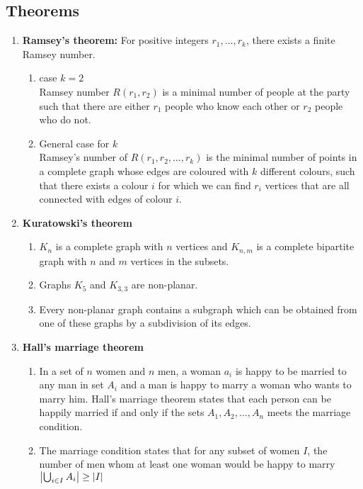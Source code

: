 \documentclass{article}
\begin{document}
\subsection*{Theorems}
	\begin{enumerate}
		\item \textbf{Ramsey's theorem: } For positive integers $r_1,\dots,r_k$, there exists a finite Ramsey number. 
		\begin{enumerate}
		 	\item case $k=2$ \\
		 	Ramsey number $R(r_1,r_2)$ is a minimal number of people at the party such that there are either $r_1$ people who know each other or $r_2$ people who do not.
		 	\item General case for $k$ \\
		 	Ramsey's number of $R(r_1,r_2,\dots,r_k)$ is the minimal number of points in a complete graph whose edges are coloured with $k$ different colours, such that there exists a colour $i$ for which we can find $r_i$ vertices that are all connected with edges of colour $i$.
		\end{enumerate}
		
		\item \textbf{Kuratowski's theorem} %
		\begin{enumerate}
			\item $K_n$ is a complete graph with $n$ vertices and $K_{n,m}$ is a complete bipartite graph with $n$ and $m$ vertices in the subsets.
			\item Graphs $K_5$ and $K_{3,3}$ are non-planar.
			\item Every non-planar graph contains a subgraph which can be obtained from one of these graphs by a subdivision of its edges.
		
		\end{enumerate}
		\item \textbf{Hall's marriage theorem} %
		\begin{enumerate}
			\item In a set of $n$ women and $n$ men, a woman $a_i$ is happy to be married to any man in set $A_i$ and a man is happy to marry a woman who wants to marry him. Hall's marriage theorem states that each person can be happily married if and only if the sets $A_1,A_2,\dots,A_n$ meets the marriage condition.
			\item The marriage condition states that for any subset of women $I$, the number of men whom at least one woman would be happy to marry $\abs{\bigcup_{i \in I}A_i} \geq \abs{I}$
		\end{enumerate}
	\end{enumerate}
\end{document}
